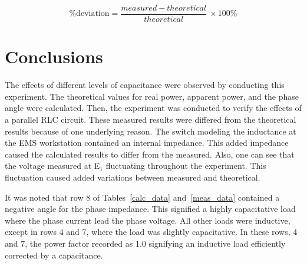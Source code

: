 \documentclass{article}
\begin{document}
\[\text{\%deviation} = \frac{measured - theoretical}{theoretical}\ \times \text{100\%}\]

\section{Conclusions}
The effects of different levels of capacitance were observed by conducting this
experiment. The theoretical values for real power, apparent power, and the
phase angle were calculated. Then, the experiment was conducted to verify the
effects of a parallel RLC circuit. These measured results were differed from
the theoretical results because of one underlying reason. The switch modeling
the inductance at the EMS workstation contained an internal impedance.  This
added impedance caused the calculated results to differ from the measured.
Also, one can see that the voltage measured at E$_1$ fluctuating throughout the
experiment. This fluctuation caused added variations between measured and
theoretical.

It was noted that row 8 of Tables~\ref{calc_data} and~\ref{meas_data} contained
a negative angle for the phase impedance. This signified a highly capacitative
load where the phase current lead the phase voltage. All other loads were
inductive, except in rows 4 and 7, where the load was slightly capacitative. In
these rows, 4 and 7, the power factor recorded as 1.0 signifying an inductive
load efficiently corrected by a capacitance.
\end{document}
